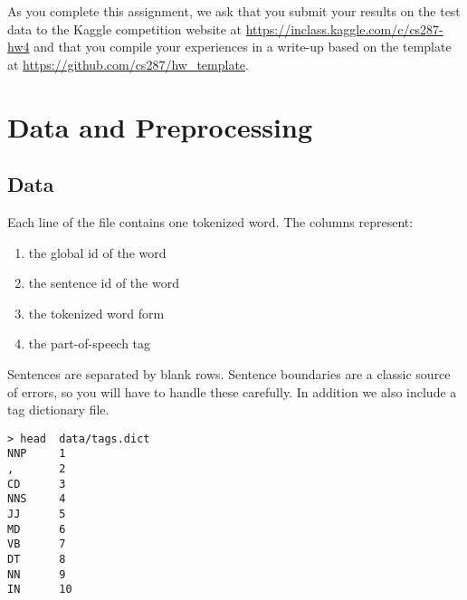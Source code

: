 \documentclass[11pt]{article}
\begin{document}
As you complete this assignment, we ask that you submit your results
on the test data to the Kaggle competition website at
\url{https://inclass.kaggle.com/c/cs287-hw4} and that you compile your
experiences in a write-up based on the template at
\url{https://github.com/cs287/hw_template}.

\section{Data and Preprocessing}

\subsection{Data}




\vspace{0.5cm}

Each line of the file contains one tokenized word. The columns represent:

\begin{enumerate}
\item the global id of the word
\item the sentence id of the word
\item the tokenized word form
\item the part-of-speech tag
\end{enumerate}

\noindent Sentences are separated by blank rows. Sentence boundaries are a
classic source of errors, so you will have to handle these carefully. In addition we also include a tag dictionary file. 

\begin{verbatim}
> head  data/tags.dict 
NNP     1
,       2
CD      3
NNS     4
JJ      5
MD      6
VB      7
DT      8
NN      9
IN      10
\end{verbatim}
\end{document}
